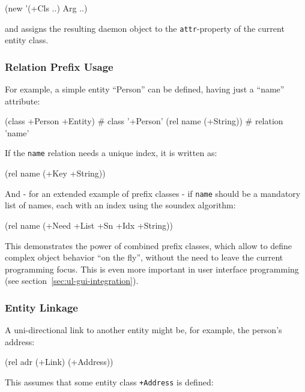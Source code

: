 \begin{wideverbatim}
(new '(+Cls ..) Arg ..)
\end{wideverbatim}

and assigns the resulting daemon object to the \texttt{attr}-property of the
current entity class.

 
\subsubsection{Relation Prefix Usage}
\label{sec:ul-relat-pref-usage}
For example, a simple entity ``Person'' can be defined, having just a
``name'' attribute:

\begin{wideverbatim}
(class +Person +Entity) # class '+Person'
(rel name (+String))    # relation 'name'
\end{wideverbatim}

If the \texttt{name} relation needs a unique index, it is written as:


\begin{wideverbatim}
(rel name (+Key +String))
\end{wideverbatim}

And - for an extended example of prefix classes - if \texttt{name} should be a
mandatory list of names, each with an index using the soundex algorithm:


\begin{wideverbatim}
(rel name (+Need +List +Sn +Idx +String))
\end{wideverbatim}

This demonstrates the power of combined prefix classes, which allow to
define complex object behavior ``on the fly'', without the need to leave
the current programming focus. This is even more important in user
interface programming (see section~\vref{sec:ul-gui-integration}).


\subsubsection{Entity Linkage}
\label{sec:ul-entity-linkage}

A uni-directional link to another entity might be, for example, the
person's address:


\begin{wideverbatim}
(rel adr (+Link) (+Address))
\end{wideverbatim}

This assumes that some entity class \texttt{+Address} is defined:


